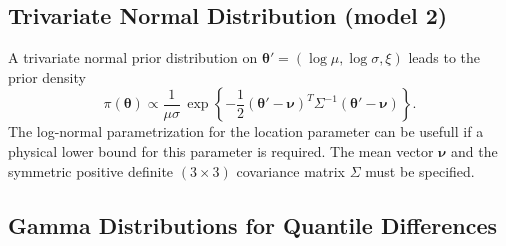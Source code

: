 \documentclass[11pt,a4paper]{article}
\newcommand{\bs}{\boldsymbol}
\begin{document}
\subsection{Trivariate Normal Distribution (model 2)}

A trivariate normal prior distribution on $\bs{\theta}' = (\log \mu, \log
\sigma, \xi)$ leads to the prior density
\begin{equation}
  \pi(\bs{\theta}) \propto \frac{1}{\mu\sigma} \, \exp\left\{-\frac{1}{2}
    (\bs{\theta}' - \bs{\nu})^T \Sigma^{-1} (\bs{\theta}' - \bs{\nu})
  \right\}. 
\label{priornorm2}
\end{equation}  
The log-normal parametrization for the location parameter can be
usefull if a physical lower bound for this parameter is required.  The
mean vector $\bs{\nu}$ and the symmetric positive definite $(3 \times
3)$ covariance matrix $\Sigma$ must be specified.

\subsection{Gamma Distributions for Quantile Differences}
\label{spriorgamma}
\end{document}
